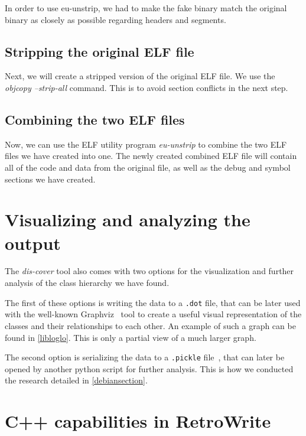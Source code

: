 \documentclass[a4paper,11pt,oneside]{report}
\begin{document}
In order to use eu-unstrip, we had to make the fake binary match the original
binary as closely as possible regarding headers and segments.

\subsection{Stripping the original ELF file}

Next, we will create a stripped version of the original ELF file.
We use the \emph{objcopy --strip-all} command.
This is to avoid section conflicts in the next step.

\subsection{Combining the two ELF files}
\label{combiningelf}

Now, we can use the ELF utility program \emph{eu-unstrip} to combine the two 
ELF files we have created into one.
The newly created combined ELF file will contain all of the code and data from 
the original file, as well as the debug and symbol sections we have created.


\section{Visualizing and analyzing the output}
\label{visualizingsection}

The \emph{dis-cover} tool also comes with two options for the visualization
and further analysis of the class hierarchy we have found.

The first of these options is writing the data to a \texttt{.dot} file, that
can be later used with the well-known Graphviz~\cite{graphviz} tool to create
a useful visual representation of the classes and their relationships to each
other. An example of such a graph can be found in \autoref{libloglo}. This is
only a partial view of a much larger graph.

The second option is serializing the data to a \texttt{.pickle}
file~\cite{pickle}, that can later be opened by another python script for
further analysis.
This is how we conducted the research detailed in \autoref{debiansection}.


\section{C++ capabilities in RetroWrite}
\label{retrowriteimplementation}
\end{document}
